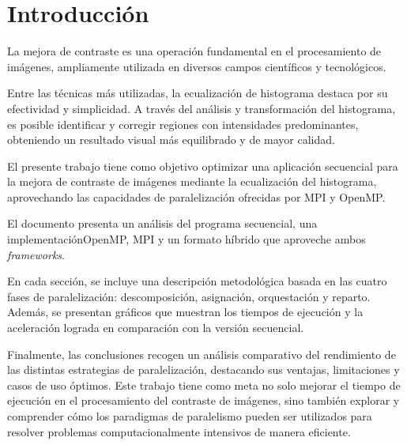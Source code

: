 \part{Introducción}
La mejora de contraste es una operación fundamental en el procesamiento de imágenes, ampliamente utilizada en diversos campos científicos y tecnológicos.

Entre las técnicas más utilizadas, la ecualización de histograma destaca por su efectividad y simplicidad. A través del análisis y transformación del histograma, es posible identificar y corregir regiones con intensidades predominantes, obteniendo un resultado visual más equilibrado y de mayor calidad.

El presente trabajo tiene como objetivo optimizar una aplicación secuencial para la mejora de contraste de imágenes mediante la ecualización del histograma, aprovechando las capacidades de paralelización ofrecidas por MPI y OpenMP.

El documento presenta un análisis del programa secuencial, una implementación\newline OpenMP, MPI y un formato híbrido que aproveche ambos \textit{frameworks}.

En cada sección, se incluye una descripción metodológica basada en las cuatro fases de paralelización: descomposición, asignación, orquestación y reparto. Además, se presentan gráficos que muestran los tiempos de ejecución y la aceleración lograda en comparación con la versión secuencial. 

Finalmente, las conclusiones recogen un análisis comparativo del rendimiento de las distintas estrategias de paralelización, destacando sus ventajas, limitaciones y casos de uso óptimos. Este trabajo tiene como meta no solo mejorar el tiempo de ejecución en el procesamiento del contraste de imágenes, sino también explorar y comprender cómo los paradigmas de paralelismo pueden ser utilizados para resolver problemas computacionalmente intensivos de manera eficiente.